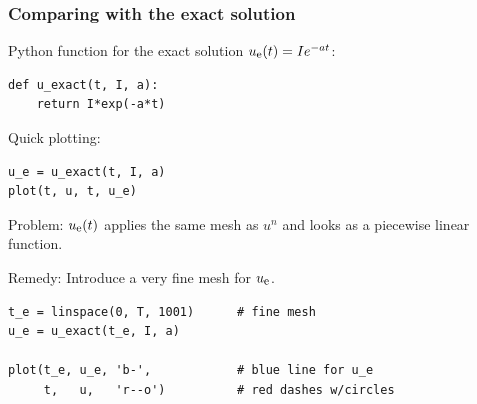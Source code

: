 \documentclass{beamer}
\begin{document}
\begin{frame}
\frametitle{Comparing with the exact solution}

Python function for the exact solution $\uex(t)=Ie^{-at}$:

\begin{verbatim}
def u_exact(t, I, a):
    return I*exp(-a*t)
\end{verbatim}

Quick plotting:

\begin{verbatim}
u_e = u_exact(t, I, a)
plot(t, u, t, u_e)
\end{verbatim}

Problem: $\uex(t)$ applies the same mesh as $u^n$ and
looks as a piecewise linear function.

Remedy: Introduce a very fine mesh for $\uex$.

\begin{verbatim}
t_e = linspace(0, T, 1001)      # fine mesh
u_e = u_exact(t_e, I, a)

plot(t_e, u_e, 'b-',            # blue line for u_e
     t,   u,   'r--o')          # red dashes w/circles
\end{verbatim}
\end{frame}
\end{document}
